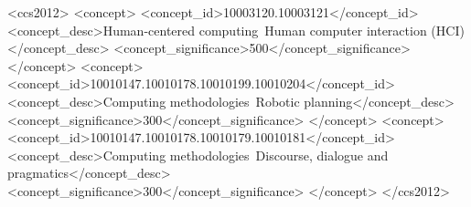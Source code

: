 \documentclass[sigconf,authordraft]{acmart}
\begin{document}


\begin{CCSXML}
<ccs2012>
   <concept>
       <concept_id>10003120.10003121</concept_id>
       <concept_desc>Human-centered computing~Human computer interaction (HCI)</concept_desc>
       <concept_significance>500</concept_significance>
       </concept>
   <concept>
       <concept_id>10010147.10010178.10010199.10010204</concept_id>
       <concept_desc>Computing methodologies~Robotic planning</concept_desc>
       <concept_significance>300</concept_significance>
       </concept>
   <concept>
       <concept_id>10010147.10010178.10010179.10010181</concept_id>
       <concept_desc>Computing methodologies~Discourse, dialogue and pragmatics</concept_desc>
       <concept_significance>300</concept_significance>
       </concept>
 </ccs2012>
\end{CCSXML}


\end{document}
